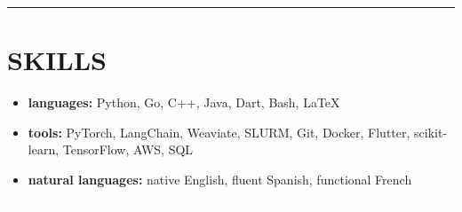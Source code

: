 \documentclass[11pt,letterpaper]{article}
\newcommand*{\cvsection}[1]{
  \vspace{2mm}
  \hrule
  \vspace*{-0.6em}
  \section*{#1}
  \vspace*{-0.4em}
}
\begin{document}
\cvsection{SKILLS}

\begin{minipage}{\linewidth}
  \small\begin{multicols}{2}
    \begin{itemize}
      \setlength\itemsep{0ex}
      \item \textbf{languages:} Python, Go, C++, Java, Dart, Bash, \LaTeX{}
      \item \textbf{tools:} PyTorch, LangChain, Weaviate, SLURM, Git, Docker, Flutter, scikit-learn, TensorFlow, AWS, SQL
      \item \textbf{natural languages:} native English, fluent Spanish, functional French
            \textcolor{white}{keywords: LLMs, NumPy, SciPy, Pandas, PySpark, Linux, Android}
    \end{itemize}
  \end{multicols}
\end{minipage}
\end{document}
